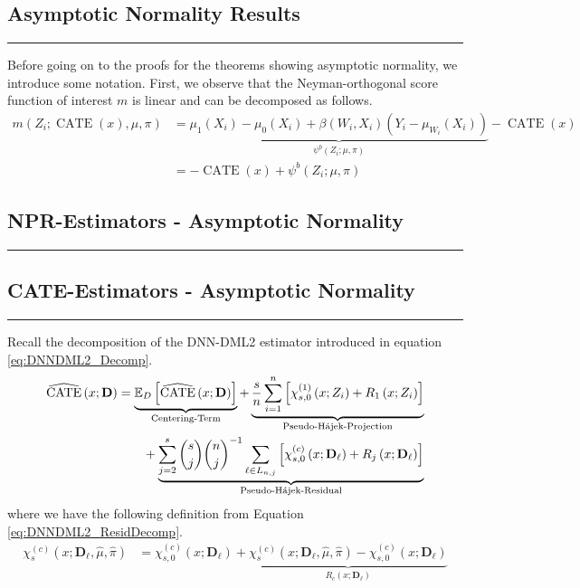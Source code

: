 \subsection{Asymptotic Normality Results}
\hrule

Before going on to the proofs for the theorems showing asymptotic normality, we introduce some notation.
First, we observe that the Neyman-orthogonal score function of interest $m$ is linear and can be decomposed as follows.
\begin{equation}
    \begin{aligned}
        m\left(Z_{i}; \operatorname{CATE}(x), \mu, \pi\right)
		  & = \underbrace{\mu_1\left(X_{i}\right) - \mu_0\left(X_{i}\right) + \beta\left(W_{i}, X_{i}\right)\left(Y_{i} - \mu_{W_{i}}\left(X_{i}\right)\right)}_{\psi^{b}\left(Z_{i}; \mu, \pi\right)} 
          - \operatorname{CATE}\left(x\right)\\
          & = - \operatorname{CATE}\left(x\right) + \psi^{b}\left(Z_{i}; \mu, \pi\right)
    \end{aligned}
\end{equation}  

\subsection{NPR-Estimators - Asymptotic Normality}
\hrule

\subsection{CATE-Estimators - Asymptotic Normality}
\hrule
Recall the decomposition of the DNN-DML2 estimator introduced in equation \ref{eq:DNNDML2_Decomp}.
\begin{equation}
    \begin{aligned}
        \widehat{\operatorname{CATE}}\left(x; \mathbf{D}\right)
        & = \underbrace{\mathbb{E}_{D}\left[\widehat{\operatorname{CATE}}\left(x; \mathbf{D}\right)\right]}_{\text{Centering-Term}}
        + \underbrace{\frac{s}{n} \sum_{i = 1}^{n} \left[\chi_{s,0}^{(1)}\left(x; Z_{i}\right) + R_{1}\left(x; Z_{i}\right)  \right]}_{\text{Pseudo-H\'ajek-Projection}}\\
        & \quad \quad + \underbrace{\sum_{j = 2}^{s} \binom{s}{j} \binom{n}{j}^{-1}\sum_{\ell \in L_{n,j}} \left[\chi_{s,0}^{(c)}\left(x; \mathbf{D}_{\ell}\right) + R_{j}\left(x; \mathbf{D}_{\ell}\right)\right]}_{\text{Pseudo-H\'ajek-Residual}}
    \end{aligned}
\end{equation}
where we have the following definition from Equation \ref{eq:DNNDML2_ResidDecomp}.
\begin{equation}
    \begin{aligned}
        \chi_{s}^{(c)}\left(x; \mathbf{D}_{\ell}, \hat{\mu}, \hat{\pi}\right)
        & = \chi_{s,0}^{(c)}\left(x; \mathbf{D}_{\ell}\right) + \underbrace{\chi_{s}^{(c)}\left(x; \mathbf{D}_{\ell}, \hat{\mu}, \hat{\pi}\right) - \chi_{s,0}^{(c)}\left(x; \mathbf{D}_{\ell}\right)}_{R_{c}\left(x; \mathbf{D}_{\ell}\right)}
    \end{aligned}
\end{equation}

